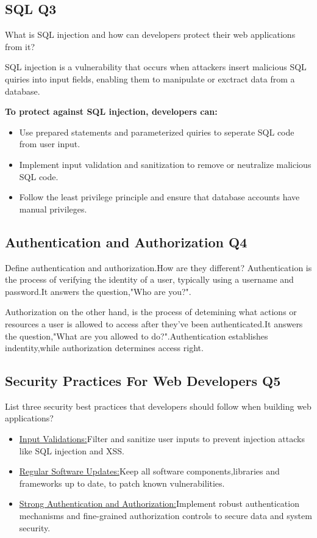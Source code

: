 \documentclass{article}
\begin{document}
\subsection{SQL Q3}What is SQL injection and how can developers protect their web applications from it?\par
SQL injection is a vulnerability that occurs when attackers insert malicious SQL quiries into input fields, enabling them to manipulate or exctract data from a database.\par
\textbf{To protect against SQL injection, developers can:}
\begin{itemize}
    \item Use prepared statements and parameterized quiries to seperate SQL code from user input.
    \item Implement input validation and sanitization to remove or neutralize malicious SQL code.
    \item Follow the least privilege principle and ensure that database accounts have manual privileges. 
\end{itemize}

\subsection{ Authentication and Authorization Q4}Define authentication and authorization.How are they different?
Authentication is the process of verifying the identity of a user, typically using a username and password.It answers the question,"Who are you?".\par
Authorization on the other hand, is the process of detemining what actions or resources a user is allowed to access after they've been authenticated.It answers the question,"What are you allowed to do?".Authentication establishes indentity,while authorization determines  access right.

\subsection{Security Practices For  Web Developers Q5}List three security best practices that  developers should follow when building web applications?
\begin{itemize}
    \item \underline{Input Validations:}Filter and sanitize user inputs to prevent injection attacks like SQL injection and XSS.
    \item \underline{Regular Software Updates:}Keep all software components,libraries and frameworks up to date, to patch known vulnerabilities.
    \item \underline{Strong Authentication and Authorization:}Implement robust authentication mechanisms and fine-grained authorization controls to secure data and system security.  
\end{itemize}
\end{document}
